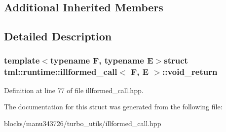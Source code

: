 \subsection*{Additional Inherited Members}


\subsection{Detailed Description}
\subsubsection*{template$<$typename F, typename E$>$struct tml\+::runtime\+::illformed\+\_\+call$<$ F, E $>$\+::void\+\_\+return}



Definition at line 77 of file illformed\+\_\+call.\+hpp.



The documentation for this struct was generated from the following file\+:\begin{DoxyCompactItemize}
\item 
blocks/manu343726/turbo\+\_\+utils/illformed\+\_\+call.\+hpp\end{DoxyCompactItemize}
